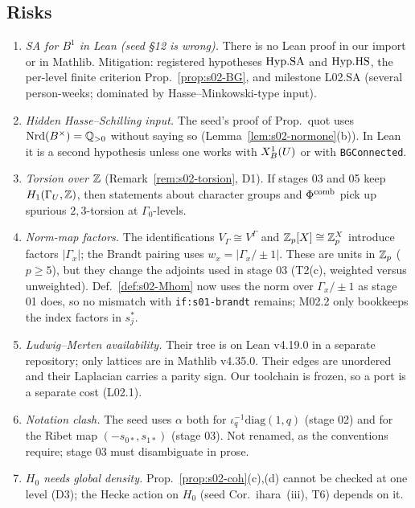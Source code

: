 \subsection{Risks}
\begin{enumerate}[label=R\arabic*.]
\item \emph{SA for $B^1$ in Lean (seed \S12 is wrong).} There is no Lean proof in our import or in Mathlib.
  Mitigation: registered hypotheses $\mathrm{Hyp.SA}$ and $\mathrm{Hyp.HS}$, the per-level finite criterion
  Prop.~\ref{prop:s02-BG}, and milestone L02.SA (several person-weeks; dominated by Hasse--Minkowski-type
  input).
\item \emph{Hidden Hasse--Schilling input.} The seed's proof of Prop.~quot uses $\mathrm{Nrd}(B^\times)=\mathbb{Q}_{>0}$ without
  saying so (Lemma~\ref{lem:s02-normone}(b)). In Lean it is a second hypothesis unless one works with
  $X^1_B(U)$ or with \texttt{BGConnected}.
\item \emph{Torsion over $\mathbb{Z}$} (Remark~\ref{rem:s02-torsion}, D1). If stages 03 and 05 keep
  $H_1(\Gamma_U,\mathbb{Z})$, then statements about character groups and $\Phi^{\mathrm{comb}}$ pick up spurious $2,3$-torsion at
  $\Gamma_0$-levels.
\item \emph{Norm-map factors.} The identifications $V_{\Gamma}\cong V^{\Gamma}$ and $\mathbb{Z}_p[X]\cong\mathbb{Z}_p^X$ introduce
  factors $|\Gamma_x|$; the Brandt pairing uses $w_x=|\Gamma_x/\pm1|$. These are units in $\mathbb{Z}_p$ ($p\ge5$), but they
  change the adjoints used in stage 03 (T2(c), weighted versus unweighted). Def.~\ref{def:s02-Mhom} now uses the norm over $\Gamma_x/\pm1$ as stage 01 does, so
  no mismatch with \texttt{if:s01-brandt} remains; M02.2 only bookkeeps the index factors in $s_j^*$.
\item \emph{Ludwig--Merten availability.} Their tree is on Lean v4.19.0 in a separate repository; only lattices are
  in Mathlib v4.35.0. Their edges are unordered and their Laplacian carries a parity sign. Our toolchain is
  frozen, so a port is a separate cost (L02.1).
\item \emph{Notation clash.} The seed uses $\alpha$ both for $\iota_q^{-1}\mathrm{diag}(1,q)$ (stage 02) and for the
  Ribet map $(-s_{0*},s_{1*})$ (stage 03). Not renamed, as the conventions require; stage 03 must disambiguate
  in prose.
\item \emph{$H_0$ needs global density.} Prop.~\ref{prop:s02-coh}(c),(d) cannot be checked at one level
  (D3); the Hecke action on $H_0$ (seed Cor.~ihara~(iii), T6) depends on it.
\end{enumerate}
